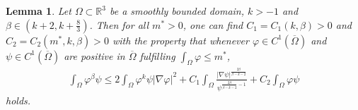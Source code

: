 \documentclass[12pt]{article}
\theoremstyle{plain}
\newtheorem{lemma}{Lemma}[section]
\theoremstyle{definition}
\numberwithin{equation}{section}
\begin{document}
\begin{lemma}\label{lemma3.4}
Let $\Omega\subset\mathbb{R}^3$ be  a smoothly bounded domain, $k>-1$ and $\beta\in (k+2,k+\frac{8}{3})$. Then for all $m^*>0$, one can find $C_1=C_1(k, \beta)>0$ and $C_2=C_2(m^*,k,\beta)>0$ with the property that whenever $\varphi\in C^1(\overline \Omega)$ and $\psi \in C^1(\overline \Omega)$ are positive %
in $\overline \Omega$ fulfilling  $\int_{\Omega}\varphi\leq m^*$,
  \begin{align}\label{3.6}
    \int_{\Omega}\varphi^{\beta}\psi\leq  2\int_{\Omega}\varphi^{k}\psi|\nabla \varphi|^2+C_1\int_\Omega\frac{|\nabla \psi|^{\frac{2\beta}{\beta-k-2}}}{\psi^{\frac{2\beta}{\beta-k-2}-1}}+C_2\int_{\Omega}\varphi \psi
\end{align} holds.
\end{lemma}
\end{document}
